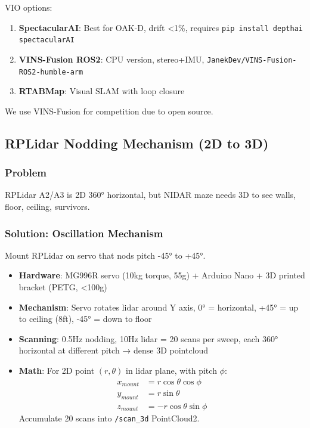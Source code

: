 \documentclass[12pt,a4paper]{article}
\begin{document}
VIO options:
\begin{enumerate}
    \item \textbf{SpectacularAI}: Best for OAK-D, drift <1\%, requires \texttt{pip install depthai spectacularAI}
    \item \textbf{VINS-Fusion ROS2}: CPU version, stereo+IMU, \texttt{JanekDev/VINS-Fusion-ROS2-humble-arm}
    \item \textbf{RTABMap}: Visual SLAM with loop closure
\end{enumerate}
We use VINS-Fusion for competition due to open source.

\subsection{RPLidar Nodding Mechanism (2D to 3D)}

\subsubsection{Problem}
RPLidar A2/A3 is 2D 360° horizontal, but NIDAR maze needs 3D to see walls, floor, ceiling, survivors.

\subsubsection{Solution: Oscillation Mechanism}
Mount RPLidar on servo that nods pitch -45° to +45°.

\begin{itemize}
    \item \textbf{Hardware}: MG996R servo (10kg torque, 55g) + Arduino Nano + 3D printed bracket (PETG, <100g)
    \item \textbf{Mechanism}: Servo rotates lidar around Y axis, 0° = horizontal, +45° = up to ceiling (8ft), -45° = down to floor
    \item \textbf{Scanning}: 0.5Hz nodding, 10Hz lidar = 20 scans per sweep, each 360° horizontal at different pitch → dense 3D pointcloud
    \item \textbf{Math}: For 2D point $(r,\theta)$ in lidar plane, with pitch $\phi$:
    \begin{align}
    x_{mount} &= r \cos\theta \cos\phi \\
    y_{mount} &= r \sin\theta \\
    z_{mount} &= -r \cos\theta \sin\phi
    \end{align}
    Accumulate 20 scans into \texttt{/scan\_3d} PointCloud2.
\end{itemize}
\end{document}
